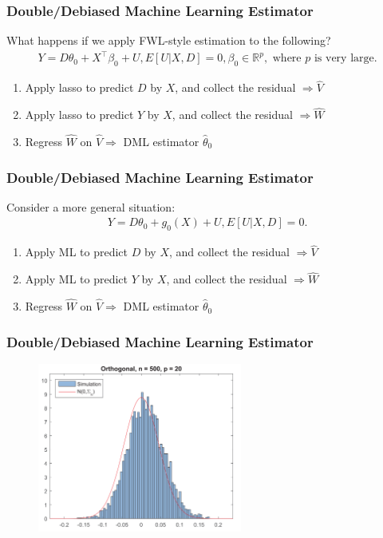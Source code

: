 \documentclass[aspectratio=169, 12pt]{beamer}
\newcommand{\R}{\mathbb{R}}
\begin{document}
	\begin{frame}
	\frametitle{Double/Debiased Machine Learning Estimator}
	What happens if we apply FWL-style estimation to the following?
	\begin{eqnarray*}
	Y = D\theta_0 + X^\top \beta_0 + U, E[U|X,D]=0, \beta_0 \in \R^p, \text{ where } p \text{ is very large.}
	\end{eqnarray*}
	\begin{enumerate}
	\item Apply lasso to predict $D$ by $X$, and collect the residual $\Rightarrow \hat{V} $
	\item Apply lasso to predict $Y$ by $X$, and collect the residual $\Rightarrow \hat{W} $
	\item Regress $\hat{W} $ on $\hat{V} \Rightarrow$ DML estimator $\hat{\theta}_0 $
	\end{enumerate}

	\end{frame}

	\begin{frame}
	\frametitle{Double/Debiased Machine Learning Estimator}
	Consider a more general situation:
	\begin{eqnarray*}
	Y = D\theta_0 + g_0(X) + U, E[U|X,D]=0.
	\end{eqnarray*}
	\begin{enumerate}
	\item Apply ML to predict $D$ by $X$, and collect the residual $\Rightarrow \hat{V} $
	\item Apply ML to predict $Y$ by $X$, and collect the residual $\Rightarrow \hat{W} $
	\item Regress $\hat{W} $ on $\hat{V} \Rightarrow$ DML estimator $\hat{\theta}_0 $
	\end{enumerate}

	\end{frame}

	\begin{frame}
	\frametitle{Double/Debiased Machine Learning Estimator}
	\begin{figure}
	\includegraphics[width=0.6\textwidth]{fig/fig1b.png}
	\end{figure}

	\end{frame}
\end{document}
